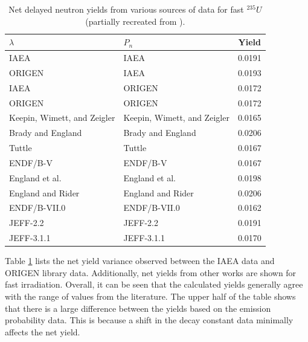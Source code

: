 \documentclass{style/nseJournal}
\begin{document}
\begin{table}[]
\caption{Net delayed neutron yields from various sources of data for fast $^{235}U$ (partially recreated from \cite{doi:10.13182/NSE103-129, huynh2014calculation}).}
\centering
\begin{tabular}{|l l c|} 
 \hline
 $\lambda$ & $P_n$ & Yield \\
 \hline\hline
     IAEA & IAEA & 0.0191 \\
   ORIGEN & IAEA & 0.0193 \\
   IAEA & ORIGEN & 0.0172 \\
  ORIGEN & ORIGEN & 0.0172 \\
 \hline
  Keepin, Wimett, and Zeigler \cite{KEEPIN1957IN2} & Keepin, Wimett, and Zeigler \cite{KEEPIN1957IN2} & 0.0165 \\
 Brady and England \cite{doi:10.13182/NSE103-129} & Brady and England \cite{doi:10.13182/NSE103-129} & 0.0206 \\
 Tuttle \cite{tuttle1979delayed} & Tuttle \cite{tuttle1979delayed} & 0.0167 \\
 ENDF/B-V \cite{endfb5} & ENDF/B-V \cite{endfb5} & 0.0167 \\
 England et al. \cite{WILSON200271} & England et al. \cite{WILSON200271} & 0.0198 \\
 England and Rider \cite{england1983status} & England and Rider \cite{england1983status} & 0.0206 \\
 ENDF/B-VII.0 \cite{chadwick2006endf} & ENDF/B-VII.0 \cite{chadwick2006endf} & 0.0162 \\
 JEFF-2.2 \cite{JEF2.2_2000} & JEFF-2.2 \cite{JEF2.2_2000} & 0.0191 \\
 JEFF-3.1.1 \cite{santamarina2009jeff} & JEFF-3.1.1 \cite{santamarina2009jeff} & 0.0170 \\
 \hline
\end{tabular}

\label{table:datasets}
\end{table}

Table \ref{table:datasets} lists the net yield variance observed between the IAEA data and ORIGEN library data.
Additionally, net yields from other works are shown for fast  irradiation.
Overall, it can be seen that the calculated yields generally agree with the range of values from the literature.
The upper half of the table shows that there is a large difference between the yields based on the emission probability data.
This is because a shift in the decay constant data minimally affects the net yield.
\end{document}
